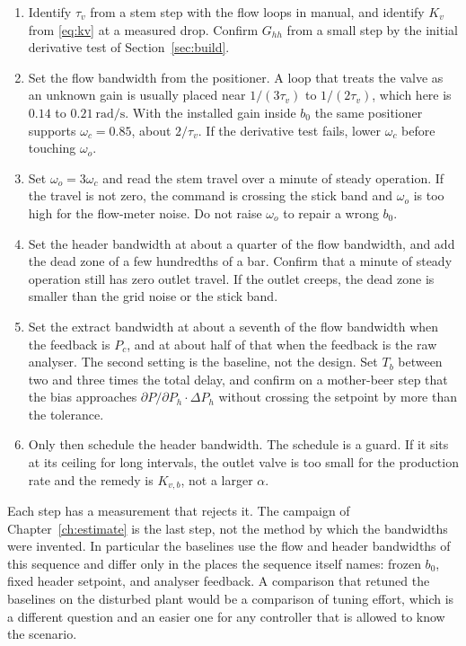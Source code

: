 \begin{enumerate}
\item Identify $\tau_v$ from a stem step with the flow loops in manual, and identify $K_v$ from \eqref{eq:kv} at a measured drop. Confirm $G_{hh}$ from a small step by the initial derivative test of Section~\ref{sec:build}.
\item Set the flow bandwidth from the positioner. A loop that treats the valve as an unknown gain is usually placed near $1/(3\tau_v)$ to $1/(2\tau_v)$, which here is $0.14$ to $0.21\ \si{\radian\per\second}$. With the installed gain inside $b_0$ the same positioner supports $\omega_c=0.85$, about $2/\tau_v$. If the derivative test fails, lower $\omega_c$ before touching $\omega_o$.
\item Set $\omega_o = 3\omega_c$ and read the stem travel over a minute of steady operation. If the travel is not zero, the command is crossing the stick band and $\omega_o$ is too high for the flow-meter noise. Do not raise $\omega_o$ to repair a wrong $b_0$.
\item Set the header bandwidth at about a quarter of the flow bandwidth, and add the dead zone of a few hundredths of a bar. Confirm that a minute of steady operation still has zero outlet travel. If the outlet creeps, the dead zone is smaller than the grid noise or the stick band.
\item Set the extract bandwidth at about a seventh of the flow bandwidth when the feedback is $P_c$, and at about half of that when the feedback is the raw analyser. The second setting is the baseline, not the design. Set $T_b$ between two and three times the total delay, and confirm on a mother-beer step that the bias approaches $\partial P/\partial P_h \cdot \Delta P_h$ without crossing the setpoint by more than the tolerance.
\item Only then schedule the header bandwidth. The schedule is a guard. If it sits at its ceiling for long intervals, the outlet valve is too small for the production rate and the remedy is $K_{v,b}$, not a larger $\alpha$.
\end{enumerate}

Each step has a measurement that rejects it. The campaign of Chapter~\ref{ch:estimate} is the last step, not the method by which the bandwidths were invented. In particular the baselines use the flow and header bandwidths of this sequence and differ only in the places the sequence itself names: frozen $b_0$, fixed header setpoint, and analyser feedback. A comparison that retuned the baselines on the disturbed plant would be a comparison of tuning effort, which is a different question and an easier one for any controller that is allowed to know the scenario.

